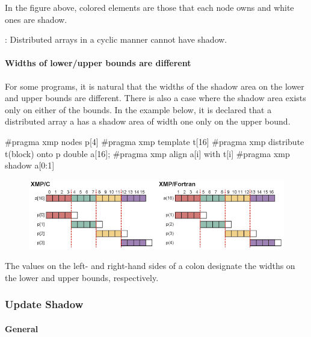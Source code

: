 In the figure above, colored elements are those that each node owns and white ones are shadow.

\noindent\hrulefill

: Distributed arrays in a cyclic manner cannot have shadow.

\noindent\hrulefill

\paragraph{Widths of lower/upper bounds are different}

For some programs, it is natural that the widths of the shadow area on
the lower and upper bounds are different. There is also a case where the
shadow area exists only on either of the bounds. In the example below,
it is declared that a distributed array a has a shadow area of width one
only on the upper bound.

\begin{XCexample}
#pragma xmp nodes p[4]
#pragma xmp template t[16]
#pragma xmp distribute t(block) onto p
double a[16];
#pragma xmp align a[i] with t[i]
#pragma xmp shadow a[0:1]
\end{XCexample}


\begin{figure}
  \centering
  \includegraphics{figs/shadow_uneven.png}
\end{figure}

The values on the left- and right-hand sides of a colon designate the
widths on the lower and upper bounds, respectively.

\subsubsection{Update Shadow}

\paragraph{General}

